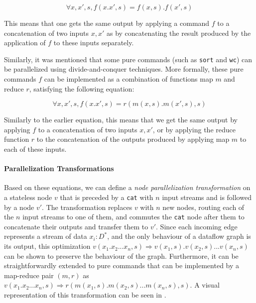 \documentclass[letterpaper,twocolumn,10pt]{article}
\newcommand{\ttt}[1]{\texttt{\small #1}}
\begin{document}
\[
\forall x, x', s, f(x.x', s) = f(x, s).f(x', s)
\]


\noindent
This means that one gets the same output by applying a command $f$ to a
concatenation of two inputs $x, x'$ as by concatenating the result
produced by the application of $f$ to these inputs
separately.

Similarly, it was mentioned that some pure commands (such
as \ttt{sort} and \ttt{wc}) can be parallelized using
divide-and-conquer techniques. More formally, these pure commands $f$
can be implemented as a combination of functions map $m$ and reduce $r$, satisfying
the following equation:

\[
\forall x, x', s, f(x.x', s) = r(m(x, s).m(x', s), s)
\]

\noindent
Similarly to the earlier equation, this means that we get the same output by
applying $f$ to a concatenation of two inputs $x, x'$, or by applying
the reduce function $r$ to the concatenation of the outputs produced
by applying map $m$ to each of these inputs.

\paragraph{Parallelization Transformations}
%
Based on these equations, we can define a \emph{node parallelization
  transformation} on a stateless node $v$ that is preceded by a
\ttt{cat} with $n$ input streams and is followed by a node $v'$. The
transformation replaces $v$ with $n$ new nodes, routing each of the
$n$ input streams to one of them, and commutes the \ttt{cat} node
after them to concatenate their outputs and transfer them to
$v'$. Since each incoming edge represents a stream of data $x_i :
D^*$, and the only behaviour of a dataflow graph is its output, this
optimization $ v(x_1.x_2...x_n, s) \Rightarrow v(x_1, s).v(x_2,
s)...v(x_n, s)$ can be shown to preserve the behaviour of the
graph. Furthermore, it can be straightforwardly extended to pure
commands that can be implemented by a map-reduce pair $(m, r)$ as $
v(x_1.x_2...x_n, s) \Rightarrow r(m(x_1, s).m(x_2, s)...m(x_n, s),
s)$. A visual representation of this transformation can be seen in
.
\end{document}
